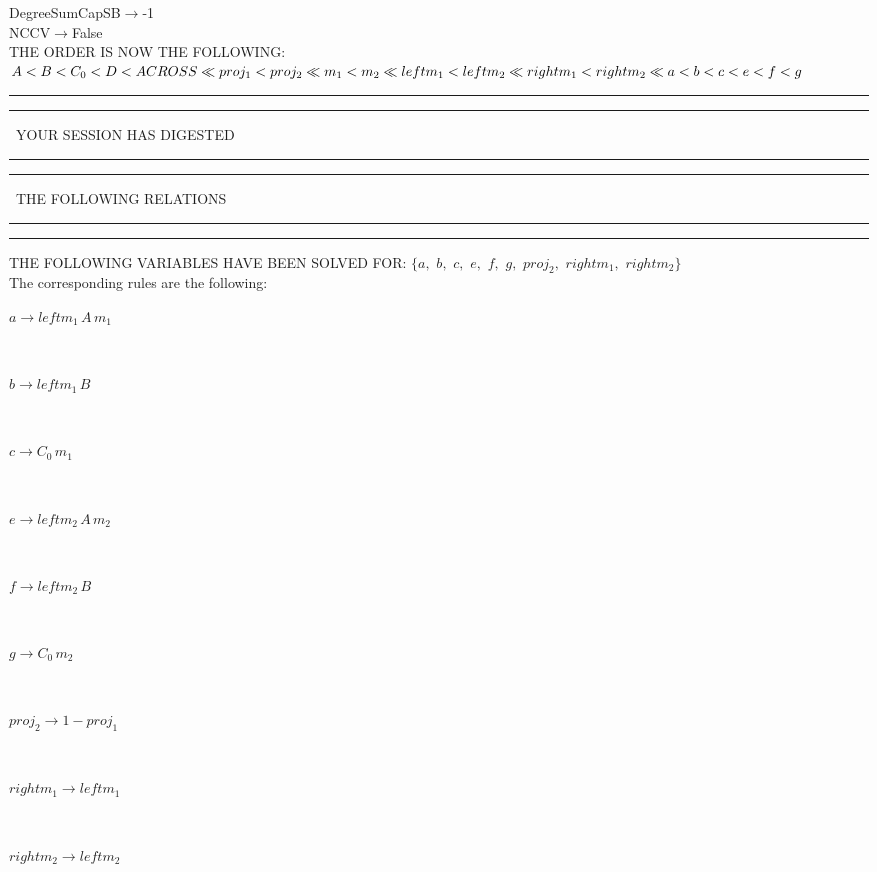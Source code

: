 DegreeSumCapSB$\rightarrow $-1\\
NCCV$\rightarrow $False\\
THE ORDER IS NOW THE FOLLOWING:\hfil\break
$
A<B<C_{0}<D<ACROSS\ll
proj_{1}<proj_{2}\ll
m_{1}<m_{2}\ll
leftm_{1}<leftm_{2}\ll
rightm_{1}<rightm_{2}\ll
a<b<c<e<f<g\\
$
\rule[2pt]{6in}{4pt}\hfil\break
\rule[2pt]{1.879in}{4pt}
\ YOUR SESSION HAS DIGESTED\ 
\rule[2pt]{1.879in}{4pt}\hfil\break
\rule[2pt]{1.923in}{4pt}
\ THE FOLLOWING RELATIONS\ 
\rule[2pt]{1.923in}{4pt}\hfil\break
\rule[2pt]{6in}{4pt}\hfil\break
THE FOLLOWING VARIABLES HAVE BEEN SOLVED FOR:\hfil\break
$\{a,
$ $
b,
$ $
c,
$ $
e,
$ $
f,
$ $
g,
$ $
proj_{2},
$ $
rightm_{1},
$ $
rightm_{2}\}$
\smallskip\\
The corresponding rules are the following:\smallskip\\
\begin{minipage}{6in}
$
a\rightarrow leftm_{1}\,
 A\,
 m_{1}
$
\end{minipage}\medskip\\
\begin{minipage}{6in}
$
b\rightarrow leftm_{1}\,
 B
$
\end{minipage}\medskip\\
\begin{minipage}{6in}
$
c\rightarrow C_{0}\,
 m_{1}
$
\end{minipage}\medskip\\
\begin{minipage}{6in}
$
e\rightarrow leftm_{2}\,
 A\,
 m_{2}
$
\end{minipage}\medskip\\
\begin{minipage}{6in}
$
f\rightarrow leftm_{2}\,
 B
$
\end{minipage}\medskip\\
\begin{minipage}{6in}
$
g\rightarrow C_{0}\,
 m_{2}
$
\end{minipage}\medskip\\
\begin{minipage}{6in}
$
proj_{2}\rightarrow 1 - proj_{1}
$
\end{minipage}\medskip\\
\begin{minipage}{6in}
$
rightm_{1}\rightarrow leftm_{1}
$
\end{minipage}\medskip\\
\begin{minipage}{6in}
$
rightm_{2}\rightarrow leftm_{2}
$
\end{minipage}\medskip\\
